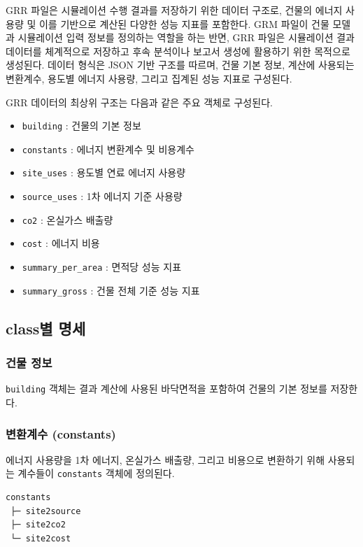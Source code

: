 GRR 파일은 시뮬레이션 수행 결과를 저장하기 위한 데이터 구조로, 건물의 에너지 사용량 및 이를 기반으로 계산된 다양한 성능 지표를 포함한다. GRM 파일이 건물 모델과 시뮬레이션 입력 정보를 정의하는 역할을 하는 반면, GRR 파일은 시뮬레이션 결과 데이터를 체계적으로 저장하고 후속 분석이나 보고서 생성에 활용하기 위한 목적으로 생성된다. 데이터 형식은 JSON 기반 구조를 따르며, 건물 기본 정보, 계산에 사용되는 변환계수, 용도별 에너지 사용량, 그리고 집계된 성능 지표로 구성된다.

GRR 데이터의 최상위 구조는 다음과 같은 주요 객체로 구성된다.

\begin{itemize}
\item \texttt{building} : 건물의 기본 정보
\item \texttt{constants} : 에너지 변환계수 및 비용계수
\item \texttt{site\_uses} : 용도별 연료 에너지 사용량
\item \texttt{source\_uses} : 1차 에너지 기준 사용량
\item \texttt{co2} : 온실가스 배출량
\item \texttt{cost} : 에너지 비용
\item \texttt{summary\_per\_area} : 면적당 성능 지표
\item \texttt{summary\_gross} : 건물 전체 기준 성능 지표
\end{itemize}

\subsection{class별 명세}

\subsubsection{건물 정보}

\texttt{building} 객체는 결과 계산에 사용된 바닥면적을 포함하여 건물의 기본 정보를 저장한다.

\subsubsection{변환계수 (constants)}

에너지 사용량을 1차 에너지, 온실가스 배출량, 그리고 비용으로 변환하기 위해 사용되는 계수들이 \texttt{constants} 객체에 정의된다.

\begin{verbatim}
constants
 ├─ site2source
 ├─ site2co2
 └─ site2cost
\end{verbatim}

